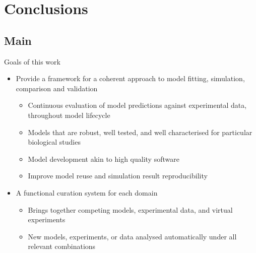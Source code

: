\documentclass[t,xcolor={usenames,dvipsnames}]{beamer}
\begin{document}
\section{Conclusions}
\subsection*{Main}

\begin{frame}{Goals of this work}
\begin{itemize}[<+->]
\item Provide a framework for a coherent approach to model fitting, simulation, comparison and validation
  \begin{itemize}[<.->]
  \item Continuous evaluation of model predictions against experimental data, throughout model lifecycle
  \item Models that are robust, well tested, and well characterised for particular biological studies
  \item Model development akin to high quality software
  \item Improve model reuse and simulation result reproducibility
  \end{itemize}
\item A functional curation system \alert{for each domain}
  \begin{itemize}[<.->]
  \item Brings together competing models, experimental data, and virtual experiments
  \item New models, experiments, or data analysed automatically under all relevant combinations
  \end{itemize}
\end{itemize}
\end{frame}
\end{document}
